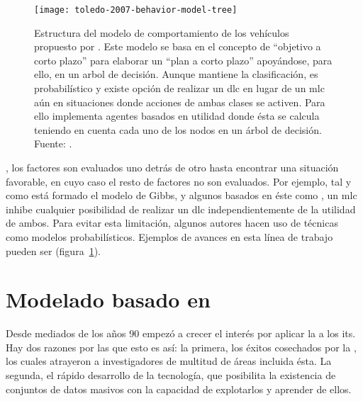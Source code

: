 \begin{figure}
	\texttt{[image: toledo-2007-behavior-model-tree]}
	\caption[Estructura del modelo de comportamiento propuesto por \cite{Toledo2007}]{Estructura del modelo de comportamiento de los vehículos propuesto por \cite{Toledo2007}. Este modelo se basa en el concepto de \enquote{objetivo a corto plazo} para elaborar un \enquote{plan a corto plazo} apoyándose, para ello, en un arbol de decisión. Aunque mantiene la clasificación, es probabilístico y existe opción de realizar un \gls{dlc} en lugar de un \gls{mlc} aún en situaciones donde acciones de ambas clases se activen. Para ello implementa agentes basados en utilidad donde ésta se calcula teniendo en cuenta cada uno de los nodos en un árbol de decisión. Fuente: \cite{Toledo2007}.}
	\label{fig:toledo-2007-behavior-model-tree}
\end{figure}

, los factores son evaluados uno detrás de otro hasta encontrar una situación favorable, en cuyo caso el resto de factores no son evaluados. Por ejemplo, tal y como está formado el modelo de Gibbs, y algunos basados en éste como \cite{Hidas2002}, un \gls{mlc} inhibe cualquier posibilidad de realizar un \gls{dlc} independientemente de la utilidad de ambos. Para evitar esta limitación, algunos autores hacen uso de técnicas como modelos probabilísticos. Ejemplos de avances en esta línea de trabajo pueden ser \cite{Toledo2003, Toledo2007, Wei2000} (figura~\ref{fig:toledo-2007-behavior-model-tree}).

\section{Modelado basado en }

Desde mediados de los años $90$ empezó a crecer el interés por aplicar la  a los \gls{its}. Hay dos razones por las que esto es así: la primera, los éxitos cosechados por la , los cuales atrayeron a investigadores de multitud de áreas incluida ésta. La segunda, el rápido desarrollo de la tecnología, que posibilita la existencia de conjuntos de datos masivos con la capacidad de explotarlos y aprender de ellos.

